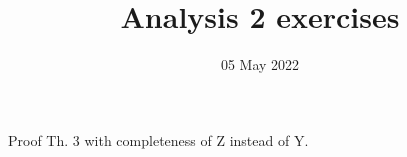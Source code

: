 
\title{Analysis 2 exercises}
\author{}
\date{05 May 2022}

\maketitle
Proof  Th. 3 with completeness of Z instead of Y.
